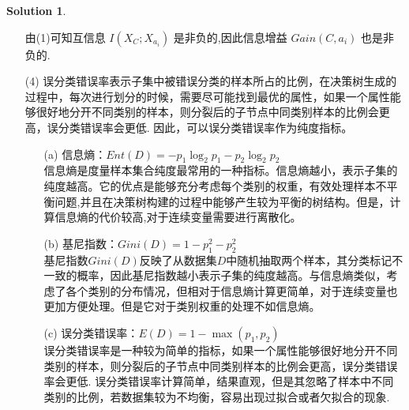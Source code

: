 \documentclass[a4paper,UTF8]{article}
\numberwithin{equation}{section}
\theoremstyle{definition}
\newtheorem*{solution}{Solution}
\begin{document}
\begin{solution}
\begin{enumerate}
由(1)可知互信息 $I(X_C; X_{a_i})$ 是非负的,因此信息增益 $Gain(C, a_i)$ 也是非负的.\\
	\item[(4)] 
	误分类错误率表示子集中被错误分类的样本所占的比例，在决策树生成的过程中，每次进行划分的时候，需要尽可能找到最优的属性，如果一个属性能够很好地分开不同类别的样本，则分裂后的子节点中同类别样本的比例会更高，误分类错误率会更低. 
	因此，可以误分类错误率作为纯度指标。
\begin{enumerate}
	\item[(a)]
	信息熵：$Ent(D) = -p_1 \log_2 p_1 - p_2 \log_2 p_2$\\
	信息熵是度量样本集合纯度最常用的一种指标。信息熵越小，表示子集的纯度越高。它的优点是能够充分考虑每个类别的权重，有效处理样本不平衡问题,并且在决策树构建的过程中能够产生较为平衡的树结构。但是，计算信息熵的代价较高,对于连续变量需要进行离散化。
	\item[(b)]
	基尼指数：$Gini(D) = 1-p_1^2-p_2^2$\\
	基尼指数$Gini(D)$反映了从数据集$D$中随机抽取两个样本，其分类标记不一致的概率，因此基尼指数越小表示子集的纯度越高。与信息熵类似，考虑了各个类别的分布情况，但相对于信息熵计算更简单，对于连续变量也更加方便处理。但是它对于类别权重的处理不如信息熵。
	\item[(c)] 
	误分类错误率：$E(D) = 1-\max(p_1, p_2)$\\
	误分类错误率是一种较为简单的指标，如果一个属性能够很好地分开不同类别的样本，则分裂后的子节点中同类别样本的比例会更高，误分类错误率会更低. 
	误分类错误率计算简单，结果直观，但是其忽略了样本中不同类别的比例，若数据集较为不均衡，容易出现过拟合或者欠拟合的现象.
\end{enumerate}
\end{enumerate}
\end{solution}

\newpage
\end{document}
